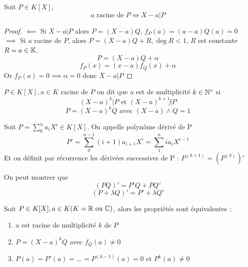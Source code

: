 \documentclass[]{report}
\begin{document}
    \begin{prop}{}{}
        Soit $P\in K[X]$, 
        \[a \text{ racine de }P \iff X-a|P\]
    \end{prop}

    \begin{proof}
        $\impliedby$ Si $X-a|P$ alors $P=(X-a)Q$, $f_P(a)=(a-a)Q(a)=0$\\
        $\implies$ Si $a$ racine de $P$, alors $P=(X-a)Q+R,\deg R<1$, $R$ est constante $R=a\in \mathbb{K}$.
        \[P=(X-a)Q+\alpha\]
        \[f_P(x)=(x-a)f_Q(x)+\alpha\]
        Or $f_P(a)=0\implies \alpha=0$ donc $X-a|P$
    \end{proof}

    \begin{df}{}{}
        $P\in K[X],a\in K$ racine de $P$ on dit que $a$ est de multiplicité $k\in \mathbb{N}^*$ si 
        $$(X-a)^k|P\text{ et }(X-a)^{k+1}\not| P$$
        $$P=(X-a)^kQ\text{ avec }(X-a)\wedge Q=1$$
    \end{df}

    \begin{df}{}{}
        Soit $P=\sum_0^na_iX^i\in K[X]$. On appelle polynôme dérivé de P $$P'=\sum_0^{n-1}(i+1)a_{i+1}X^i=\sum_1^nia_iX^{i-1}$$ Et on définit par récurrence les dérivées successives de P :  $P^{(k+1)}=(P^{(k)})'$
    \end{df}

    \begin{re}{}{}
        On peut montrer que $$(PQ)'=P'Q+PQ'$$
        $$(P+\lambda Q)'=P'+\lambda Q'$$
    \end{re}

    \begin{prop}{}{}
        Soit $P\in K[X],a\in K (K=\mathbb{R} \text{ ou }\mathbb{C})$, alors les propriétés sont équivalentes : \begin{enumerate}
            \item $a$ est racine de multiplicité $k$ de $P$
            \item $P=(X-a)^kQ$ avec $f_Q(a)\neq 0$
            \item $P(a)=P'(a)=\dots=P^{(k-1)}(a)=0$ et $P^{k}(a)\neq 0$
        \end{enumerate}
    \end{prop}
\end{document}

